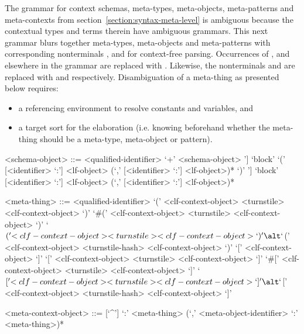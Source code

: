 The grammar for context schemas, meta-types, meta-objects, meta-patterns and meta-contexts from section~\ref{section:syntax-meta-level} is ambiguous because the contextual \LF types and terms therein have ambiguous grammars.
This next grammar blurs together meta-types, meta-objects and meta-patterns with corresponding nonterminals ,  and  for context-free parsing.
Occurrences of ,  and  elsewhere in the grammar are replaced with .
Likewise, the nonterminals  and  are replaced with  and  respectively.
Disambiguation of a meta-thing as presented below requires:
\begin{itemize}
\item a referencing environment to resolve constants and variables, and
\item a target sort for the elaboration (i.e. knowing beforehand whether the meta-thing should be a meta-type, meta-object or pattern).
\end{itemize}

\begin{grammar}
<schema-object> ::= <qualified-identifier>
 `+' <schema-object>
\alt [`some' `[' <identifier> `:' <lf-object> (`,' <identifier> `:' <lf-object>)* `]'] `block' `(' [<identifier> `:'] <lf-object> (`,' [<identifier> `:'] <lf-object>)* `)'
\alt [`some' `[' <identifier> `:' <lf-object> (`,' <identifier> `:' <lf-object>)* `]'] `block' [<identifier> `:'] <lf-object> (`,' [<identifier> `:'] <lf-object>)*

<meta-thing> ::= <qualified-identifier>
\alt `(' <clf-context-object> <turnstile> <clf-context-object> `)'
\alt `#(' <clf-context-object> <turnstile> <clf-context-object> `)'
\alt `$(' <clf-context-object> <turnstile> <clf-context-object> `)'
\alt `$(' <clf-context-object> <turnstile-hash> <clf-context-object> `)'
\alt `[' <clf-context-object> `]'
\alt `[' <clf-context-object> <turnstile> <clf-context-object> `]'
\alt `#[' <clf-context-object> <turnstile> <clf-context-object> `]'
\alt `$[' <clf-context-object> <turnstile> <clf-context-object> `]'
\alt `$[' <clf-context-object> <turnstile-hash> <clf-context-object> `]'

<meta-context-object> ::= [`^']
 `:' <meta-thing> (`,' <meta-object-identifier> `:' <meta-thing>)*
\end{grammar}

